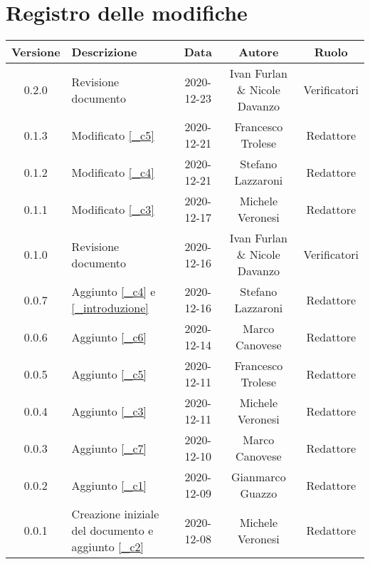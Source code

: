\section*{Registro delle modifiche}

\begin{center}
	\begin{longtable}{|c|p{5cm}|c|c|c|}
	\hline
	\rowcolor{lighter-grayer}
	\textbf{Versione} & \textbf{Descrizione} & \textbf{Data} & \textbf{Autore} & \textbf{Ruolo} \\
	\hline
	\endfirsthead

	\hline
	0.2.0 & Revisione documento & 2020-12-23 & Ivan Furlan \& Nicole Davanzo & Verificatori \\ 
	0.1.3 & Modificato \ref{_c5} & 2020-12-21 & Francesco Trolese & Redattore \\
	0.1.2 & Modificato \ref{_c4} & 2020-12-21 & Stefano Lazzaroni & Redattore \\
	0.1.1 & Modificato \ref{_c3} & 2020-12-17 & Michele Veronesi & Redattore \\
	0.1.0 & Revisione documento & 2020-12-16 & Ivan Furlan \& Nicole Davanzo & Verificatori \\
	0.0.7 & Aggiunto \ref{_c4} e \ref{_introduzione} & 2020-12-16 & Stefano Lazzaroni & Redattore \\
	0.0.6 & Aggiunto \ref{_c6} & 2020-12-14 & Marco Canovese & Redattore \\
	0.0.5 & Aggiunto \ref{_c5} & 2020-12-11 & Francesco Trolese & Redattore \\
	0.0.4 & Aggiunto \ref{_c3} & 2020-12-11 & Michele Veronesi & Redattore \\
	0.0.3 & Aggiunto \ref{_c7} & 2020-12-10 & Marco Canovese & Redattore \\
	0.0.2 & Aggiunto \ref{_c1} & 2020-12-09 & Gianmarco Guazzo & Redattore\\
    0.0.1 & Creazione iniziale del documento e aggiunto \ref{_c2} & 2020-12-08 & Michele Veronesi & Redattore\\
	\hline

	\end{longtable}
\end{center}
